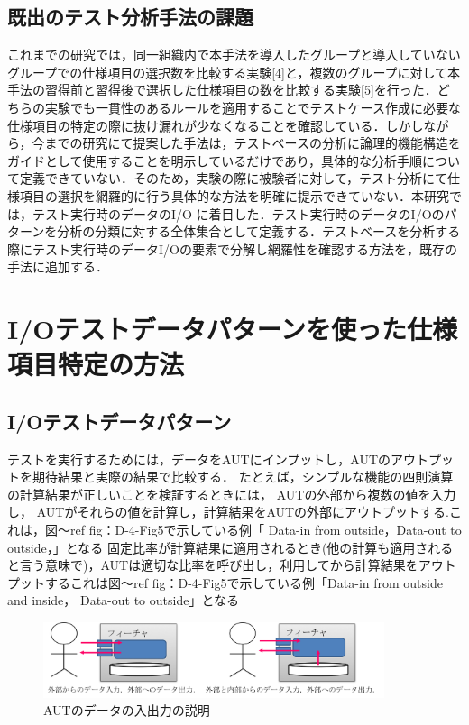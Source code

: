 \documentclass[a4paper,12pt]{jreport}
\begin{document}
\subsection{既出のテスト分析手法の課題}
これまでの研究では，同一組織内で本手法を導入したグループと導入していないグループでの仕様項目の選択数を比較する実験[4]と，複数のグループに対して本手法の習得前と習得後で選択した仕様項目の数を比較する実験[5]を行った．どちらの実験でも一貫性のあるルールを適用することでテストケース作成に必要な仕様項目の特定の際に抜け漏れが少なくなることを確認している．しかしながら，今までの研究にて提案した手法は，テストベースの分析に論理的機能構造をガイドとして使用することを明示しているだけであり，具体的な分析手順について定義できていない．そのため，実験の際に被験者に対して，テスト分析にて仕様項目の選択を網羅的に行う具体的な方法を明確に提示できていない．本研究では，テスト実行時のデータのI/O に着目した．テスト実行時のデータのI/Oのパターンを分析の分類に対する全体集合として定義する．テストベースを分析する際にテスト実行時のデータI/Oの要素で分解し網羅性を確認する方法を，既存の手法に追加する．

\section{I/Oテストデータパターンを使った仕様項目特定の方法}

\subsection{I/Oテストデータパターン}

テストを実行するためには，データをAUTにインプットし，AUTのアウトプットを期待結果と実際の結果で比較する．
たとえば，シンプルな機能の四則演算の計算結果が正しいことを検証するときには， AUTの外部から複数の値を入力し， AUTがそれらの値を計算し，計算結果をAUTの外部にアウトプットする.これは，図〜ref {fig：D-4-Fig5}で示している例「 Data-in from outside，Data-out to outside，」となる
固定比率が計算結果に適用されるとき(他の計算も適用されると言う意味で)，AUTは適切な比率を呼び出し，利用してから計算結果をアウトプットするこれは図〜ref {fig：D-4-Fig5}で示している例「Data-in from outside and inside， Data-out to outside」となる
 \begin{figure}[htbp]
  \begin{center}
  \includegraphics[width=10cm]{./image/D-3-Fig4.png}
  \caption{AUTのデータの入出力の説明}
  \label{fig:D-4-Fig5}
  \end{center}
   \end{figure}
\end{document}
